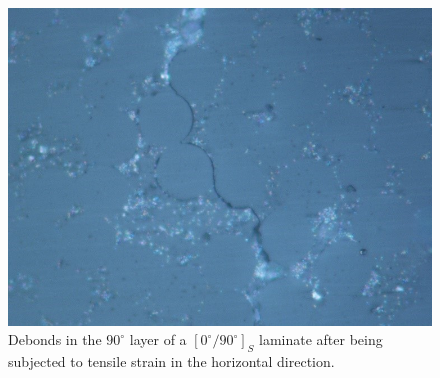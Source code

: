\begin{figure}[!htb]
\centering
  \includegraphics[height=0.225\textheight]{paperD/debonds.jpg}
\caption{Debonds in the $90^{\circ}$ layer of a $\left[0^{\circ}/90^{\circ}\right]_{S}$ laminate after being subjected to tensile strain in the horizontal direction.}\label{paperD:fig:debonds-microscope}
\end{figure}


